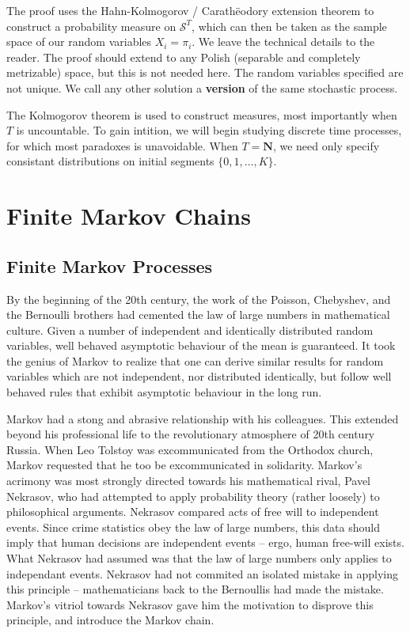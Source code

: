 The proof uses the Hahn-Kolmogorov / Carath\"{e}odory extension theorem to construct a probability measure on $\mathcal{S}^T$, which can then be taken as the sample space of our random variables $X_i = \pi_i$. We leave the technical details to the reader. The proof should extend to any Polish (separable and completely metrizable) space, but this is not needed here. The random variables specified are not unique. We call any other solution a {\bf version} of the same stochastic process.

The Kolmogorov theorem is used to construct measures, most importantly when $T$ is uncountable. To gain intition, we will begin studying discrete time processes, for which most paradoxes is unavoidable. When $T = \mathbf{N}$, we need only specify consistant distributions on initial segments $\{ 0, 1, \dots, K \}$.

\chapter{Finite Markov Chains}

\section{Finite Markov Processes}

By the beginning of the 20th century, the work of the Poisson, Chebyshev, and the Bernoulli brothers had cemented the law of large numbers in mathematical culture. Given a number of independent and identically distributed random variables, well behaved asymptotic behaviour of the mean is guaranteed. It took the genius of Markov to realize that one can derive similar results for random variables which are not independent, nor distributed identically, but follow well behaved rules that exhibit asymptotic behaviour in the long run.

Markov had a stong and abrasive relationship with his colleagues. This extended beyond his professional life to the revolutionary atmosphere of 20th century Russia. When Leo Tolstoy was excommunicated from the Orthodox church, Markov requested that he too be excommunicated in solidarity. Markov's acrimony was most strongly directed towards his mathematical rival, Pavel Nekrasov, who had attempted to apply probability theory (rather loosely) to philosophical arguments. Nekrasov compared acts of free will to independent events. Since crime statistics obey the law of large numbers, this data should imply that human decisions are independent events -- ergo, human free-will exists. What Nekrasov had assumed was that the law of large numbers only applies to independant events. Nekrasov had not commited an isolated mistake in applying this principle -- mathematicians back to the Bernoullis had made the mistake. Markov's vitriol towards Nekrasov gave him the motivation to disprove this principle, and introduce the Markov chain.

